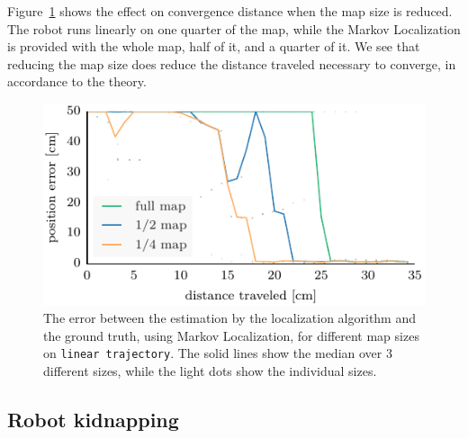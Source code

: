 \documentclass[letterpaper, 10pt, conference]{ieeeconf}
\newcommand{\Fig}[1]{Figure~\ref{fig:#1}}
\begin{document}
\Fig{small-maps} shows the effect on convergence distance when the map size is reduced.
The robot runs linearly on one quarter of the map, while the Markov Localization is provided with the whole map, half of it, and a quarter of it.
We see that reducing the map size does reduce the distance traveled necessary to converge, in accordance to the theory.

\begin{figure}
\includegraphics{ml-small_maps-xy}
\caption{The error between the estimation by the localization algorithm and the ground truth, using Markov Localization, for different map sizes on \texttt{linear trajectory}.
The solid lines show the median over 3 different sizes, while the light dots show the individual sizes.}
\label{fig:small-maps}
\end{figure}

\subsection{Robot kidnapping}
\end{document}
